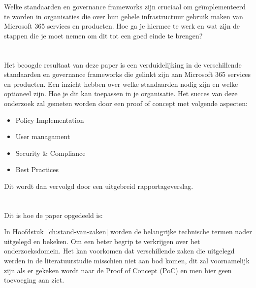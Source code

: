 Welke standaarden en governance frameworks zijn cruciaal om geïmplementeerd te worden in organisaties die over hun gehele infrastructuur gebruik maken van Microsoft 365 services en producten.
Hoe ga je hiermee te werk en wat zijn de stappen die je moet nemen om dit tot een goed einde te brengen?

\section{}%
\label{sec:onderzoeksdoelstelling}

Het beoogde resultaat van deze paper is een verduidelijking in de verschillende standaarden en governance frameworks die gelinkt zijn aan Microsoft 365 services en producten.
Een inzicht hebben over welke standaarden nodig zijn en welke optioneel zijn. Hoe je dit kan toepassen in je organisatie.
Het succes van deze onderzoek zal gemeten worden door een proof of concept met volgende aspecten:
\begin{itemize}
  \item Policy Implementation
  \item User managament
  \item Security \& Compliance
  \item Best Practices
\end{itemize}

Dit wordt dan vervolgd door een uitgebreid rapportageverslag.

\section{}%
\label{sec:opzet-bachelorproef}


Dit is hoe de paper opgedeeld is:

In Hoofdstuk~\ref{ch:stand-van-zaken} worden de belangrijke technische termen nader uitgelegd en bekeken. Om een beter begrip te verkrijgen over het onderzoeksdomein.
Het kan voorkomen dat verschillende zaken die uitgelegd werden in de literatuurstudie misschien niet aan bod komen, dit zal voornamelijk zijn als er gekeken wordt naar de Proof of Concept (PoC) en men hier geen toevoeging aan ziet.

